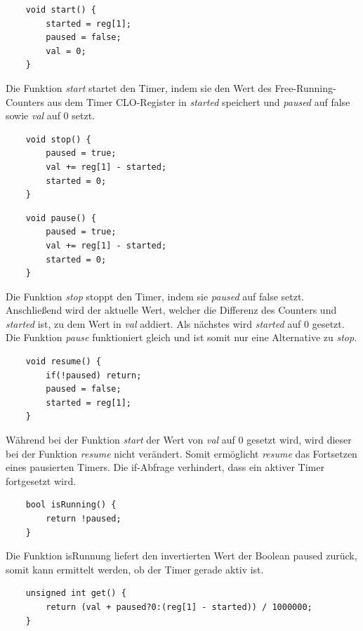 \documentclass[12pt]{article}
\begin{document}
\begin{verbatim}
    void start() {
        started = reg[1];
        paused = false;
        val = 0;
    }
\end{verbatim}
\vspace{-2mm}
Die Funktion \textit{start} startet den Timer, indem sie den Wert des Free-Running-Counters aus dem Timer CLO-Register in \textit{started} speichert und \textit{paused} auf false sowie \textit{val} auf 0 setzt.\\
\begin{verbatim}
    void stop() {
        paused = true;
        val += reg[1] - started;
        started = 0;
    }
\end{verbatim}
\begin{verbatim}
    void pause() {
        paused = true;
        val += reg[1] - started;
        started = 0;
    }
\end{verbatim}
\vspace{-2mm}
Die Funktion \textit{stop} stoppt den Timer, indem sie \textit{paused} auf false setzt. Anschließend wird der aktuelle Wert, welcher die Differenz des Counters und \textit{started} ist, zu dem Wert in \textit{val} addiert. Als nächstes wird \textit{started} auf 0 gesetzt. Die Funktion \textit{pause} funktioniert gleich und ist somit nur eine Alternative zu \textit{stop}.\\
\begin{verbatim}
    void resume() {
        if(!paused) return;
        paused = false;
        started = reg[1];
    }
\end{verbatim}
\vspace{-2mm}
Während bei der Funktion \textit{start} der Wert von \textit{val} auf 0 gesetzt wird, wird dieser bei der Funktion \textit{resume} nicht verändert. Somit ermöglicht \textit{resume} das Fortsetzen eines pausierten Timers. Die if-Abfrage verhindert, dass ein aktiver Timer fortgesetzt wird.\\
\begin{verbatim}
    bool isRunning() {
        return !paused;
    }
\end{verbatim}
\vspace{-2mm}
Die Funktion isRunnung liefert den invertierten Wert der Boolean paused zurück, somit kann ermittelt werden, ob der Timer gerade aktiv ist.\\
\begin{verbatim}
    unsigned int get() {
        return (val + paused?0:(reg[1] - started)) / 1000000;
    }
\end{verbatim}
\end{document}

